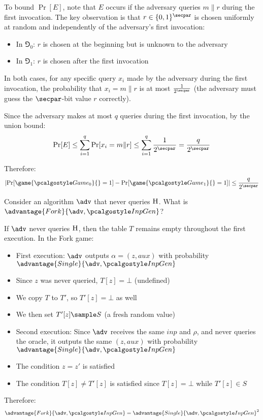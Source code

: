 \begin{mysolution}
  To bound $\Pr[E]$, note that $E$ occurs if the adversary queries $m \| r$ during the first invocation. The key observation is that $r \in \{0,1\}^\secpar$ is chosen uniformly at random and independently of the adversary's first invocation:
  \begin{itemize}
    \item In $\Game_0$: $r$ is chosen at the beginning but is unknown to the adversary
    \item In $\Game_1$: $r$ is chosen after the first invocation
  \end{itemize}
  
  In both cases, for any specific query $x_i$ made by the adversary during the first invocation, the probability that $x_i = m \| r$ is at most $\frac{1}{2^\secpar}$ (the adversary must guess the $\secpar$-bit value $r$ correctly).
  
  Since the adversary makes at most $q$ queries during the first invocation, by the union bound:
  \[
  \Pr[E] \leq \sum_{i=1}^q \Pr[x_i = m \| r] \leq \sum_{i=1}^q \frac{1}{2^\secpar} = \frac{q}{2^\secpar}
  \]
  
  Therefore:
  \[
  \left|\Pr[\game{\Game_0}{} = 1] - \Pr[\game{\Game_1}{} = 1]\right| \leq \frac{q}{2^\secpar}
  \]
\end{mysolution}
\fi

\begin{exercise}
  Consider an algorithm $\adv$ that never queries ${\normalfont\textsc{H}}$. What is $\advantage{Fork}{\adv, \algo{InpGen}}$?
\end{exercise}

\ifsolutions
\begin{mysolution}
  If $\adv$ never queries ${\normalfont\textsc{H}}$, then the table $T$ remains empty throughout the first execution. In the Fork game:
  
  \begin{itemize}
    \item First execution: $\adv$ outputs $\alpha = (z, \mathit{aux})$ with probability $\advantage{Single}{\adv, \algo{InpGen}}$
    \item Since $z$ was never queried, $T[z] = \bot$ (undefined)
    \item We copy $T$ to $T'$, so $T'[z] = \bot$ as well
    \item We then set $T'[z] \sample S$ (a fresh random value)
    \item Second execution: Since $\adv$ receives the same $\mathit{inp}$ and $\rho$, and never queries the oracle, it outputs the same $(z, \mathit{aux})$ with probability $\advantage{Single}{\adv, \algo{InpGen}}$
    \item The condition $z = z'$ is satisfied
    \item The condition $T[z] \neq T'[z]$ is satisfied since $T[z] = \bot$ while $T'[z] \in S$
  \end{itemize}
  
  Therefore:
  \[
  \advantage{Fork}{\adv, \algo{InpGen}} = \advantage{Single}{\adv, \algo{InpGen}}^2
  \]
\end{mysolution}
\fi

